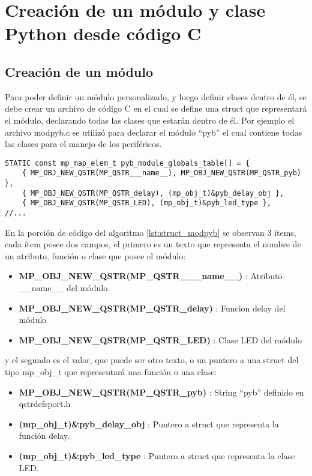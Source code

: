 
\chapter{Creación de un módulo y clase Python desde código C} %

\label{AppendixA} %

\section{Creación de un módulo}

Para poder definir un módulo personalizado, y luego definir clases dentro de él, se debe crear un archivo de código C en el cual se define una struct que representará el módulo, declarando todas las clases que estarán dentro de él. Por ejemplo el archivo modpyb.c se utilizó para declarar el módulo “pyb” el cual contiene todas las clases para el manejo de los periféricos.

\begin{lstlisting}[label={lst:struct_modpyb},caption=Estructura donde se definen los atributos\, funciones y clases del módulo.] 
STATIC const mp_map_elem_t pyb_module_globals_table[] = {
    { MP_OBJ_NEW_QSTR(MP_QSTR___name__), MP_OBJ_NEW_QSTR(MP_QSTR_pyb) },
    { MP_OBJ_NEW_QSTR(MP_QSTR_delay), (mp_obj_t)&pyb_delay_obj },
    { MP_OBJ_NEW_QSTR(MP_QSTR_LED), (mp_obj_t)&pyb_led_type },
//...
\end{lstlisting}

En la porción de código del algoritmo \ref{lst:struct_modpyb} se observan 3 ítems, cada ítem posee dos campos, el primero es un texto que representa el nombre de un atributo, función o clase que posee el módulo:
\begin{itemize}
\item \textbf{MP\_OBJ\_NEW\_QSTR(MP\_QSTR\_\_\_name\_\_)} : Atributo \_\_name\_\_ del módulo.
\item \textbf{MP\_OBJ\_NEW\_QSTR(MP\_QSTR\_delay)} : Funcion delay del módulo
\item \textbf{MP\_OBJ\_NEW\_QSTR(MP\_QSTR\_LED)} : Clase LED del módulo
\end{itemize}

y el segundo es el valor, que puede ser otro texto, o un puntero a una struct del tipo mp\_obj\_t que representará una función o una clase:
\begin{itemize}
\item \textbf{MP\_OBJ\_NEW\_QSTR(MP\_QSTR\_pyb)} : String “pyb” definido en qstrdefsport.h
\item \textbf{(mp\_obj\_t)\&pyb\_delay\_obj} : Puntero a struct que representa la función delay.
\item \textbf{(mp\_obj\_t)\&pyb\_led\_type} : Puntero a struct que representa la clase LED.
\end{itemize}

